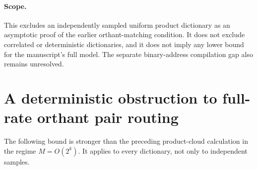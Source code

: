 \documentclass[11pt]{article}
\begin{document}
\paragraph{Scope.}
This excludes an independently sampled uniform product dictionary
as an asymptotic proof of the earlier orthant-matching condition.
It does not exclude correlated or deterministic dictionaries, and
it does not imply any lower bound for the manuscript's full model.
The separate binary-address compilation gap also remains unresolved.

\section{A deterministic obstruction to full-rate orthant pair routing}

The following bound is stronger than the preceding product-cloud
calculation in the regime $M=O(2^k)$. It applies to every dictionary,
not only to independent samples.
\end{document}
